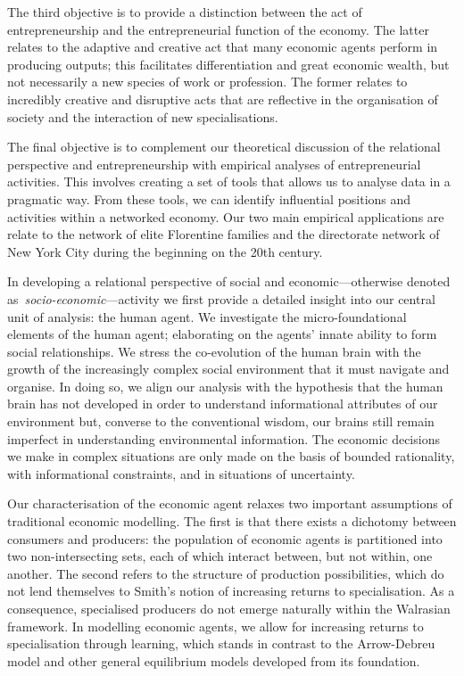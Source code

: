 The third objective is to provide a distinction between the act of entrepreneurship and the entrepreneurial function of the economy. The latter relates to the adaptive and creative act that many economic agents perform in producing outputs; this facilitates differentiation and great economic wealth, but not necessarily a new species of work or profession. The former relates to incredibly creative and disruptive acts that are reflective in the organisation of society and the interaction of new specialisations.

The final objective is to complement our theoretical discussion of the relational perspective and entrepreneurship with empirical analyses of entrepreneurial activities. This involves creating a set of tools that allows us to analyse data in a pragmatic way. From these tools, we can identify influential positions and activities within a networked economy. Our two main empirical applications are relate to the network of elite Florentine families and the directorate network of New York City during the beginning on the 20th century.

\medskip\noindent In developing a relational perspective of social and economic---otherwise denoted as~\emph{socio-economic}---activity we first provide a detailed insight into our central unit of analysis: the human agent. We investigate the micro-foundational elements of the human agent; elaborating on the agents' innate ability to form social relationships. We stress the co-evolution of the human brain with the growth of the increasingly complex social environment that it must navigate and organise. In doing so, we align our analysis with the hypothesis that the human brain has not developed in order to understand informational attributes of our environment but, converse to the conventional wisdom, our brains still remain imperfect in understanding environmental information. The economic decisions we make in complex situations are only made on the basis of bounded rationality, with informational constraints, and in situations of uncertainty.

Our characterisation of the economic agent relaxes two important assumptions of traditional economic modelling. The first is that there exists a dichotomy between consumers and producers: the population of economic agents is partitioned into two non-intersecting sets, each of which interact between, but not within, one another. The second refers to the structure of production possibilities, which do not lend themselves to Smith's notion of increasing returns to specialisation. As a consequence, specialised producers do not emerge naturally within the Walrasian framework. In modelling economic agents, we allow for increasing returns to specialisation through learning, which stands in contrast to the Arrow-Debreu model and other general equilibrium models developed from its foundation.

